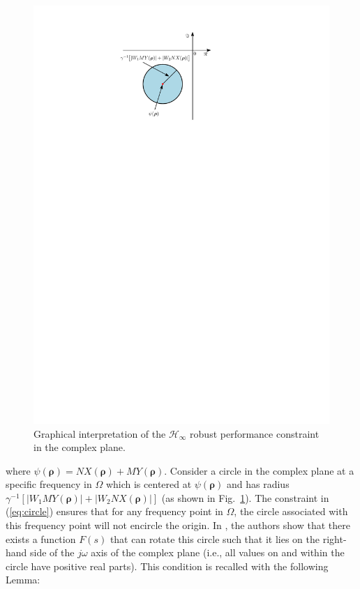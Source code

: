 \documentclass[letterpaper, 10 pt, conference]{ieeeconf}  %
\begin{document}
\begin{figure}
\centering
\includegraphics[width=0.7\columnwidth]{../pics/circle_rotation_RP.pdf}
\caption{Graphical interpretation of the $\mathcal{H}_\infty$ robust performance constraint in the complex plane.}
\label{fig:circle}
\end{figure}
where $\psi(\bm{\rho}) = NX(\bm{\rho})+MY(\bm{\rho})$. Consider a circle in the complex plane at a specific frequency in $\Omega$ which is centered at $\psi(\bm{\rho})$ and has radius $\gamma^{-1}\left[ |W_1MY(\bm{\rho})| + |W_2 NX(\bm{\rho})| \right]$ (as shown in Fig.~\ref{fig:circle}). The constraint in (\ref{eq:circle}) ensures that for any frequency point in $\Omega$, the circle associated with this frequency point will not encircle the origin. In \cite{KNZ16}, the authors show that there exists a function $F(s)$ that can rotate this circle such that it lies on the right-hand side of the $j\omega$ axis of the complex plane (i.e., all values on and within the circle have positive real parts). This condition is recalled with the following Lemma:
\end{document}

